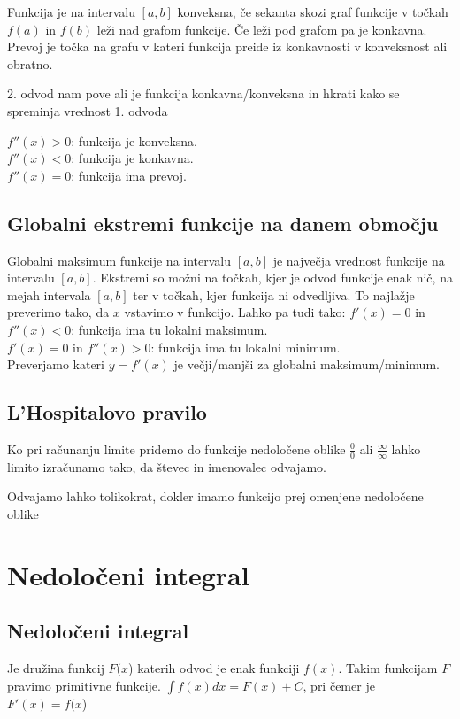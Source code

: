 \documentclass[12pt]{report}
\begin{document}
Funkcija je na intervalu $[a,b]$ konveksna, če sekanta skozi graf funkcije v točkah $f(a)$ in $f(b)$ leži nad grafom funkcije. Če leži pod grafom pa je konkavna.\\
Prevoj je točka na grafu v kateri funkcija preide iz konkavnosti v konveksnost ali obratno.
\bigbreak


2. odvod nam pove ali je funkcija konkavna/konveksna in hkrati kako se spreminja vrednost 1. odvoda
\bigbreak

$f''(x) > 0$: funkcija je konveksna.\\
$f''(x) < 0$: funkcija je konkavna.\\
$f''(x) = 0$: funkcija ima prevoj.

\section*{Globalni ekstremi funkcije na danem območju}
Globalni maksimum funkcije na intervalu $[a,b]$ je največja vrednost funkcije na intervalu $[a,b]$.
Ekstremi so možni na točkah, kjer je odvod funkcije enak nič, na mejah intervala $[a, b]$ ter v točkah, kjer funkcija ni odvedljiva. To najlažje preverimo tako, da $x$ vstavimo v funkcijo. Lahko pa tudi tako:
\bigbreak
$f'(x) = 0$ in $f''(x) < 0$: funkcija ima tu lokalni maksimum.\\
$f'(x) = 0$ in $f''(x) > 0$: funkcija ima tu lokalni minimum.\\
Preverjamo kateri $y=f'(x)$ je večji/manjši za globalni maksimum/minimum.

\section*{L’Hospitalovo pravilo}
Ko pri računanju limite pridemo do funkcije nedoločene oblike $\frac{0}{0}$ ali $\frac{\infty}{\infty}$ lahko limito izračunamo tako, da števec in imenovalec odvajamo.
 
Odvajamo lahko tolikokrat, dokler imamo funkcijo prej omenjene nedoločene oblike






\chapter*{Nedoločeni integral}

\section*{Nedoločeni integral}
Je družina funkcij $F(x$) katerih odvod je enak funkciji $f(x)$. Takim funkcijam $F$ pravimo primitivne funkcije.
$\int f(x)dx=F(x)+C$,	pri čemer je $F'(x)=f(x$)
\end{document}
